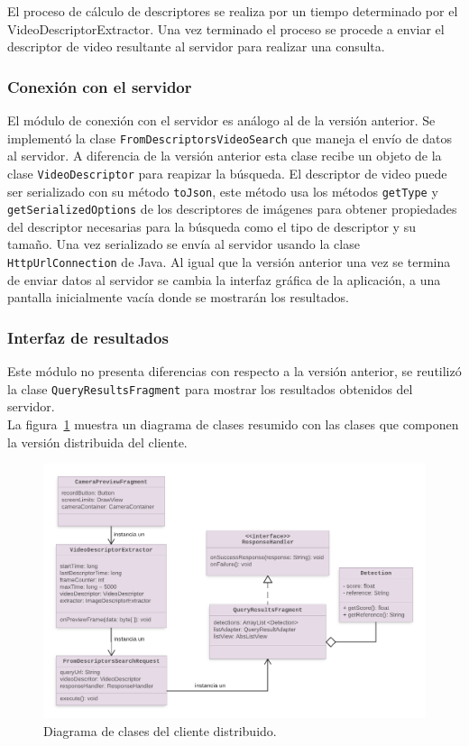 El proceso de cálculo de descriptores se realiza por un tiempo determinado por el VideoDescriptorExtractor. Una vez terminado el proceso se procede a enviar el descriptor de video resultante al servidor para realizar una consulta.

\subsubsection*{Conexión con el servidor}
 El módulo de conexión con el servidor es análogo al de la versión anterior. Se implementó la clase \texttt{FromDescriptorsVideoSearch} que maneja el envío de datos al servidor. A diferencia de la versión anterior esta clase recibe un objeto de la clase \texttt{VideoDescriptor} para reapizar la búsqueda. El descriptor de video puede ser serializado con su método \texttt{toJson}, este método usa los métodos \texttt{getType} y \texttt{getSerializedOptions} de los descriptores de imágenes para obtener propiedades del descriptor necesarias para la búsqueda como el tipo de descriptor y su tamaño. Una vez serializado se envía al servidor usando la clase \texttt{HttpUrlConnection} de Java. Al igual que la versión anterior una vez se termina de enviar datos al servidor se cambia la interfaz gráfica de la aplicación, a una pantalla inicialmente vacía donde se mostrarán los resultados.

\subsubsection*{Interfaz de resultados}
Este módulo no presenta diferencias con respecto a la versión anterior, se reutilizó la clase \texttt{QueryResultsFragment} para mostrar los resultados obtenidos del servidor.\\

La figura~\ref{diagrama_cliente_distribuido} muestra un diagrama de clases resumido con las clases que componen la versión distribuida del cliente.
	\begin{figure}[!h]
		\centering
		\includegraphics[scale=1.6]{imagenes/cap4/diagrama_cliente_distribuido.png}
		\caption{Diagrama de clases del cliente distribuido.}
		\label{diagrama_cliente_distribuido}
	\end{figure}

